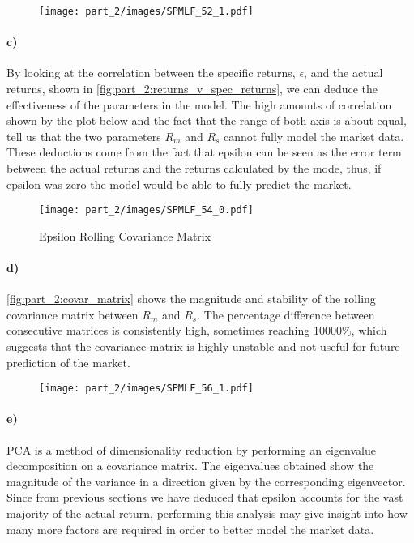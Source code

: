 \begin{figure}[!htb]
    \centering
    \texttt{[image: part\_2/images/SPMLF\_52\_1.pdf]}
    \caption{}
    \label{fig:part_2:returns_v_spec_returns}
\end{figure}


\paragraph{c)} By looking at the correlation between the specific returns, $\epsilon$, and the actual returns, shown in \autoref{fig:part_2:returns_v_spec_returns},  we can deduce the effectiveness of the parameters in the model. The high amounts of correlation shown by the plot below and the fact that the range of both axis is about equal, tell us that the two parameters $R_m$ and $R_s$ cannot fully model the market data. These deductions come from the fact that epsilon can be seen as the error term between the actual returns and the returns calculated by the mode, thus, if epsilon was zero the model would be able to fully predict the market.

\begin{figure}[!htb]
    \centering
    \texttt{[image: part\_2/images/SPMLF\_54\_0.pdf]}
    \caption{Epsilon Rolling Covariance Matrix}
    \label{fig:part_2:covar_matrix}
\end{figure}

\paragraph{d)} \autoref{fig:part_2:covar_matrix} shows the magnitude and stability of the rolling covariance matrix between $R_m$ and $R_s$. The percentage difference between consecutive matrices is consistently high, sometimes reaching 10000\%, which suggests that the covariance matrix is highly unstable and not useful for future prediction of the market.

\begin{figure}[!htb]
    \centering
    \texttt{[image: part\_2/images/SPMLF\_56\_1.pdf]}
    \caption{}
    \label{fig:part_2:PCA_apt}
\end{figure}

\paragraph{e)} PCA is a method of dimensionality reduction by performing an eigenvalue decomposition on a covariance matrix. The eigenvalues obtained show the magnitude of the variance in a direction given by the corresponding eigenvector. Since from previous sections we have deduced that epsilon accounts for the vast majority of the actual return, performing this analysis may give insight into how many more factors are required in order to better model the market data. 

